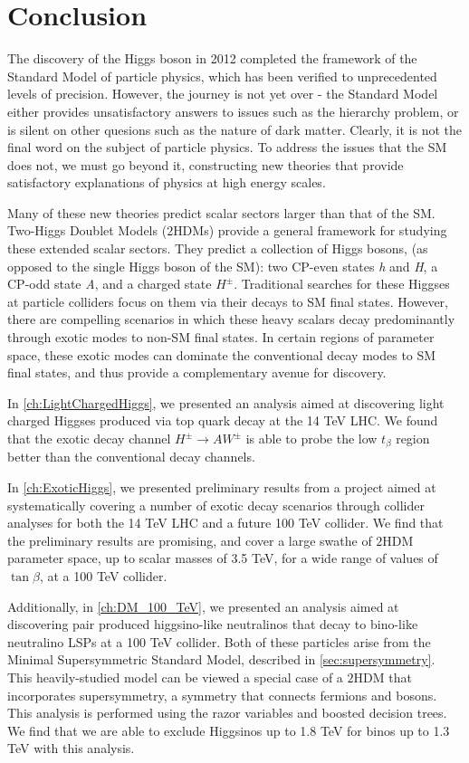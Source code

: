 \chapter{Conclusion}\label{ch:Conclusion}
The discovery of the Higgs boson in 2012 completed the framework of the Standard Model of particle physics, which has been verified to unprecedented levels of precision. However, the journey is not yet over - the Standard Model either provides unsatisfactory answers to issues such as the hierarchy problem, or is silent on other quesions such as the nature of dark matter. Clearly, it is not the final word on the subject of particle physics. To address the issues that the SM does not, we must go beyond it, constructing new theories that provide satisfactory explanations of physics at high energy scales. 

Many of these new theories predict scalar sectors larger than that of the SM. Two-Higgs Doublet Models ($2$HDMs) provide a general framework for studying these extended scalar sectors. They predict a collection of Higgs bosons, (as opposed to the single Higgs boson of the SM): two CP-even states \emph{h} and \emph{H}, a CP-odd state \emph{A}, and a charged state $H^\pm$.
Traditional searches for these Higgses at particle colliders focus on them via their decays to SM final states. However, there are compelling scenarios in which these heavy scalars decay predominantly through exotic modes to non-SM final states. In certain regions of parameter space, these exotic modes can dominate the conventional decay modes to SM final states, and thus provide a complementary avenue for discovery. 

In \autoref{ch:LightChargedHiggs}, we presented an analysis aimed at discovering light charged Higgses produced via top quark decay at the 14 TeV LHC. We found that the exotic decay channel $H^\pm\rightarrow AW^\pm$ is able to probe the low $t_\beta$ region better than the conventional decay channels.

In \autoref{ch:ExoticHiggs}, we presented preliminary results from a project aimed at systematically covering a number of exotic decay scenarios through collider analyses for both the 14 TeV LHC and a future 100 TeV collider. We find that the preliminary results are promising, and cover a large swathe of $2$HDM parameter space, up to scalar masses of 3.5 TeV, for a wide range of values of $\tan\beta$, at a 100 TeV collider.

Additionally, in \autoref{ch:DM_100_TeV}, we presented an analysis aimed at discovering pair produced higgsino-like neutralinos that decay to bino-like neutralino LSPs at a 100 TeV collider. Both of these particles arise from the Minimal Supersymmetric Standard Model, described in \autoref{sec:supersymmetry}. This heavily-studied model can be viewed a special case of a $2$HDM that incorporates supersymmetry, a symmetry that connects fermions and bosons. This analysis is performed using the razor variables and boosted decision trees. We find that we are able to exclude Higgsinos up to 1.8 TeV for binos up to 1.3 TeV with this analysis.

